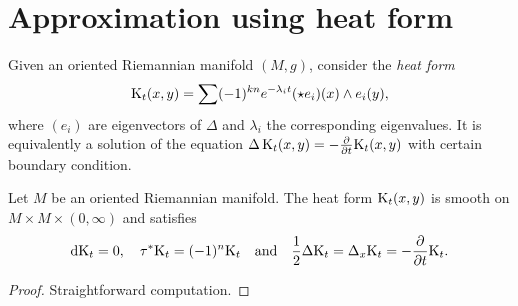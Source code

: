 \documentclass[\MainFolder/Text.tex]{subfiles}
\begin{document}
\section{Approximation using heat form}\label{Sec:Hwe}

Given an oriented Riemannian manifold $(M,g)$, consider the \emph{heat form}
\begin{equation}\label{Eq:HK}
\mathrm{K}_t(x,y) = \sum (-1)^{kn}e^{-\lambda_i t} (\star e_i)(x) \wedge e_i(y),
\end{equation}
where $(e_i)$ are eigenvectors of $\Delta$ and $\lambda_i$ the corresponding eigenvalues. It is equivalently a solution of the equation $\operatorname{\Delta} \mathrm{K}_t(x,y) = - \frac{\partial}{\partial t}\mathrm{K}_t(x,y)$ with certain boundary condition.
%
\begin{Proposition}\label{Prop:Heasd}
Let $M$ be an oriented Riemannian manifold. The heat form $\mathrm{K}_t(x,y)$ is smooth on $M\times M \times (0,\infty)$ and satisfies
$$ \mathrm{d} \mathrm{K}_t = 0, \quad \tau^*\mathrm{K}_t = (-1)^n\mathrm{K}_t\quad\text{and}\quad \frac{1}{2}\Delta \mathrm{K}_t = \Delta_x \mathrm{K}_t = - \frac{\partial }{\partial t} \mathrm{K}_t. $$
\end{Proposition}
\begin{proof}
Straightforward computation.
\end{proof}
%
\end{document}
